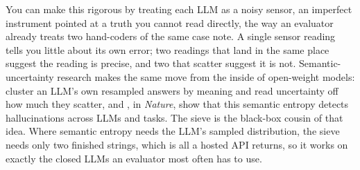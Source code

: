 \documentclass[
    a4paper,
    fontsize=10pt,
    twoside=true,
    numbers=noenddot,
]{kaobook}
\begin{document}
You can make this rigorous by treating each LLM as a noisy sensor, an imperfect instrument pointed at a truth you cannot read directly, the way an evaluator already treats two hand-coders of the same case note. A single sensor reading tells you little about its own error; two readings that land in the same place suggest the reading is precise, and two that scatter suggest it is not. Semantic-uncertainty research makes the same move from the inside of open-weight models: \textcite{kuhn2023semantic} cluster an LLM's own resampled answers by meaning and read uncertainty off how much they scatter, and \textcite{farquhar2024semantic}, in \emph{Nature}, show that this semantic entropy detects hallucinations across LLMs and tasks. The sieve is the black-box cousin of that idea. Where semantic entropy needs the LLM's sampled distribution, the sieve needs only two finished strings, which is all a hosted API returns, so it works on exactly the closed LLMs an evaluator most often has to use.
\end{document}
